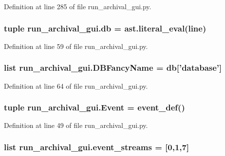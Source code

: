Definition at line 285 of file run\-\_\-archival\-\_\-gui.\-py.

\hypertarget{namespacerun__archival__gui_a243ccc20ff1988a6ee254f1436f1f540}{
\subsubsection[{db}]{\setlength{\rightskip}{0pt plus 5cm}tuple run\-\_\-archival\-\_\-gui.\-db = ast.\-literal\-\_\-eval({\bf line})}}\label{namespacerun__archival__gui_a243ccc20ff1988a6ee254f1436f1f540}


Definition at line 59 of file run\-\_\-archival\-\_\-gui.\-py.

\hypertarget{namespacerun__archival__gui_af7e6fd62864fd6f9bfa5ef7dff8e20e9}{
\subsubsection[{D\-B\-Fancy\-Name}]{\setlength{\rightskip}{0pt plus 5cm}list run\-\_\-archival\-\_\-gui.\-D\-B\-Fancy\-Name = {\bf db}\mbox{[}'database'\mbox{]}}}\label{namespacerun__archival__gui_af7e6fd62864fd6f9bfa5ef7dff8e20e9}


Definition at line 64 of file run\-\_\-archival\-\_\-gui.\-py.

\hypertarget{namespacerun__archival__gui_ae4bf328fca6859457a543a7ff933ccfa}{
\subsubsection[{Event}]{\setlength{\rightskip}{0pt plus 5cm}tuple run\-\_\-archival\-\_\-gui.\-Event = event\-\_\-def()}}\label{namespacerun__archival__gui_ae4bf328fca6859457a543a7ff933ccfa}


Definition at line 49 of file run\-\_\-archival\-\_\-gui.\-py.

\hypertarget{namespacerun__archival__gui_a663b3af69401dfd54271cd973d0bb968}{
\subsubsection[{event\-\_\-streams}]{\setlength{\rightskip}{0pt plus 5cm}list run\-\_\-archival\-\_\-gui.\-event\-\_\-streams = \mbox{[}0,1,7\mbox{]}}}\label{namespacerun__archival__gui_a663b3af69401dfd54271cd973d0bb968}


